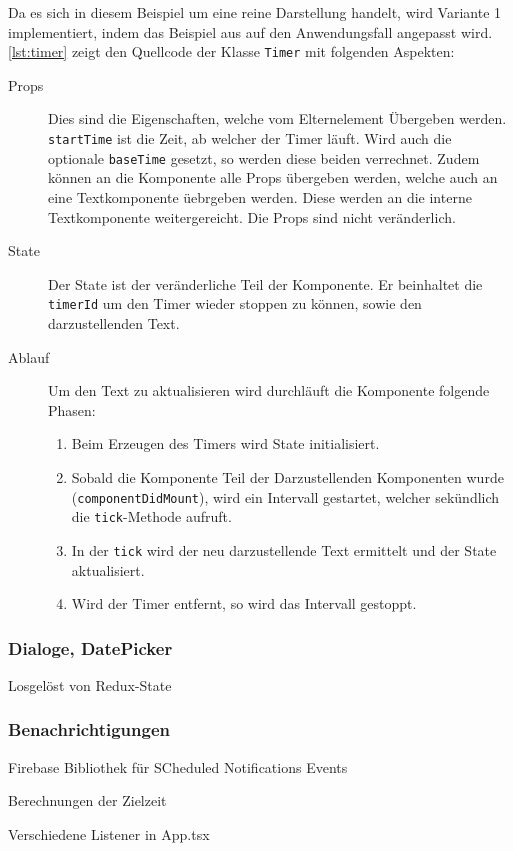 Da es sich in diesem Beispiel um eine reine Darstellung handelt,
wird Variante 1 implementiert, indem das Beispiel aus \cite{Timersin85:online} auf den Anwendungsfall angepasst wird.
\autoref{lst:timer} zeigt den Quellcode der Klasse \texttt{Timer} mit folgenden Aspekten:
\begin{description}
    \item[Props] Dies sind die Eigenschaften, welche vom Elternelement Übergeben werden.
    \texttt{startTime} ist die Zeit, ab welcher der Timer läuft.
    Wird auch die optionale \texttt{baseTime} gesetzt, so werden diese beiden verrechnet.
    Zudem können an die Komponente alle Props übergeben werden, welche auch an eine Textkomponente üebrgeben werden.
    Diese werden an die interne Textkomponente weitergereicht.
    Die Props sind nicht veränderlich.
    \item[State] Der State ist der veränderliche Teil der Komponente.
    Er beinhaltet die \texttt{timerId} um den Timer wieder stoppen zu können,
    sowie den darzustellenden Text.
    \item[Ablauf]
    Um den Text zu aktualisieren wird durchläuft die Komponente folgende Phasen:
    \begin{enumerate}
        \item Beim Erzeugen des Timers wird State initialisiert.
        \item Sobald die Komponente Teil der Darzustellenden Komponenten wurde (\texttt{componentDidMount}),
        wird ein Intervall gestartet, welcher sekündlich die \texttt{tick}-Methode aufruft.
        \item In der \texttt{tick} wird der neu darzustellende Text ermittelt und der State aktualisiert.
        \item Wird der Timer entfernt, so wird das Intervall gestoppt.
    \end{enumerate}
\end{description}





\subsubsection{Dialoge, DatePicker}
Losgelöst von Redux-State

\subsubsection{Benachrichtigungen}
Firebase Bibliothek für SCheduled Notifications
Events

Berechnungen der Zielzeit

Verschiedene Listener in App.tsx

